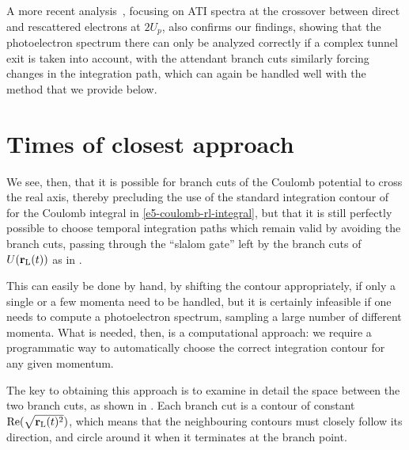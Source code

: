 A more recent analysis~\cite{keil_branch-cuts_2016}, focusing on ATI spectra at the crossover between direct and rescattered electrons at $2U_p$, also confirms our findings, showing that the photoelectron spectrum there can only be analyzed correctly if a complex tunnel exit is taken into account, with the attendant branch cuts similarly forcing changes in the integration path, which can again be handled well with the method that we provide below.












\section{Times of closest approach}
\label{sec:times-of-closest-approach}
We see, then, that it is possible for branch cuts of the Coulomb potential to cross the real axis, thereby precluding the use of the standard integration contour of  for the Coulomb integral in \eqref{e5-coulomb-rl-integral}, but that it is still perfectly possible to choose temporal integration paths which remain valid by avoiding the branch cuts, passing through the ``slalom gate'' left by the branch cuts of $U(\vb{r}_\mathrm{L}(t))$ as in .

This can easily be done by hand, by shifting the contour appropriately, if only a single or a few momenta need to be handled, but it is certainly infeasible if one needs to compute a photoelectron spectrum, sampling a large number of different momenta. What is needed, then, is a computational approach: we require a programmatic way to automatically choose the correct integration contour for any given momentum.

The key to obtaining this approach is to examine in detail the space between the two branch cuts, as shown in . Each branch cut is a contour of constant $\Re(\sqrt{\vb{r}_\mathrm{L}(t)^2})$, which means that the neighbouring contours must closely follow its direction, and circle around it when it terminates at the branch point. 

